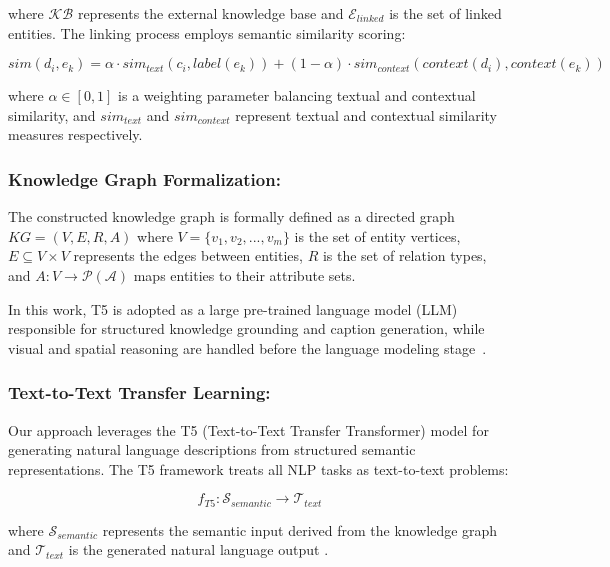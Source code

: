 \documentclass[runningheads,14pt]{llncs}
\begin{document}
where $\mathcal{KB}$ represents the external knowledge base and $\mathcal{E}_{linked}$ is the set of linked entities. The linking process employs semantic similarity scoring:

\begin{equation}
sim(d_i, e_k) = \alpha \cdot sim_{text}(c_i, label(e_k)) + (1-\alpha) \cdot sim_{context}(context(d_i), context(e_k))
\end{equation}

where $\alpha \in [0,1]$ is a weighting parameter balancing textual and contextual similarity, and $sim_{text}$ and $sim_{context}$ represent textual and contextual similarity measures respectively.

\subsubsection{Knowledge Graph Formalization:}
The constructed knowledge graph is formally defined as a directed graph $KG = (V, E, R, A)$ where $V = \{v_1, v_2, ..., v_m\}$ is the set of entity vertices, $E \subseteq V \times V$ represents the edges between entities, $R$ is the set of relation types, and $A: V \rightarrow \mathcal{P}(\mathcal{A})$ maps entities to their attribute sets.


 In this work, T5 is adopted as a large pre-trained language model (LLM) responsible for 
structured knowledge grounding and caption generation, while visual and spatial reasoning are handled before the language modeling stage~\cite{raffel2020exploring}.


\subsubsection{Text-to-Text Transfer Learning:}
Our approach leverages the T5 (Text-to-Text Transfer Transformer) model \cite{raffel2020exploring} for generating natural language descriptions from structured semantic representations. The T5 framework treats all NLP tasks as text-to-text problems:

\begin{equation}
f_{T5}: \mathcal{S}_{semantic} \rightarrow \mathcal{T}_{text}
\end{equation}

where $\mathcal{S}_{semantic}$ represents the semantic input derived from the knowledge graph and $\mathcal{T}_{text}$ is the generated natural language output \cite{raffel2020exploring}.
\end{document}
